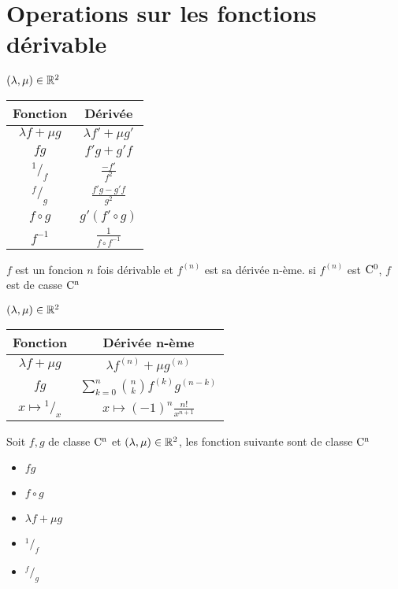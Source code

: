 \pagebreak
\section{Operations sur les fonctions dérivable}

\begin{prp}
$(\lambda, \mu) \in \mathbb{R}^2$ \\
\begin{tabular}{c|c}
Fonction &  Dérivée \\
\hline
$\lambda f + \mu g$ & $\lambda f' + \mu g'$ \\
$fg$ & $f'g + g'f$ \\
$^1/_f$ & $\frac{-f'}{f^2}$ \\
$^f/_g$ & $\frac{f'g - g'f}{g^2}$ \\
$f\circ g$ & $g'(f'\circ g)$ \\
$f^{-1}$ & $\frac{1}{f\circ f^{-1}}$ \\
\end{tabular}
\end{prp}

\begin{dfn}
$f$ est un foncion $n$ fois dérivable et $f^{(n)}$ est sa dérivée n-ème.
si $f^{(n)}$ est $\mathrm{C^{0}}$, $f$ est de casse $\mathrm{C^{n}}$
\end{dfn}

\begin{prp}
$(\lambda, \mu) \in \mathbb{R}^2$ \\
\begin{tabular}{c|c}
Fonction & Dérivée n-ème \\
\hline
$\lambda f + \mu g$ & $\lambda f^{(n)} + \mu g^{(n)}$ \\
$fg$ & $\sum_{k = 0}^{n} \binom{n}{k} f^{(k)}g^{(n - k)}$ \\
$x \mapsto {^1/_x}$ & $x \mapsto (-1)^n \frac{n!}{x^{n + 1}}$ \\
\end{tabular}
\end{prp}

\begin{prp}
Soit $f, g$ de classe $\mathrm{C^{n}}$ et $(\lambda, \mu) \in \mathbb{R}^2$,
les fonction suivante sont de classe $\mathrm{C^{n}}$
\begin{itemize}
    \item $fg$
    \item $f \circ g$
    \item $\lambda f + \mu g$
    \item $^1/_f$
    \item $^f/_g$
\end{itemize}
\end{prp}

